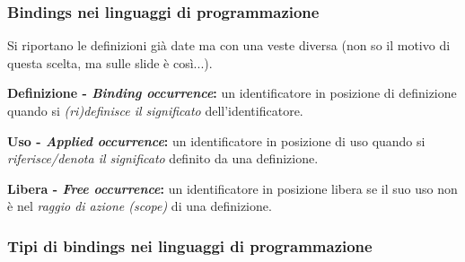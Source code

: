 \documentclass[a4paper]{article}
\begin{document}
	
	\subsubsection{Bindings nei linguaggi di programmazione}
	
	Si riportano le definizioni già date ma con una veste diversa (non so il motivo di questa scelta, ma sulle slide è così...).\newline
	
	\noindent
	\begin{boxdef}
		\textcolor{Red3}{\textbf{Definizione - \emph{Binding occurrence}:}} un identificatore in posizione di definizione quando si \emph{(ri)definisce il significato} dell'identificatore.
	\end{boxdef}\:\newline

	\noindent
	\begin{boxdef}
		\textcolor{Red3}{\textbf{Uso - \emph{Applied occurrence}:}} un identificatore in posizione di uso quando si \emph{riferisce/denota il significato} definito da una definizione.
	\end{boxdef}\:\newline
	
	\noindent
	\begin{boxdef}
		\textcolor{Red3}{\textbf{Libera - \emph{Free occurrence}:}} un identificatore in posizione libera se il suo uso non è nel \emph{raggio di azione (scope)} di una definizione.
	\end{boxdef}\newpage
	
	
	\subsubsection{Tipi di bindings nei linguaggi di programmazione}
	
\end{document}
